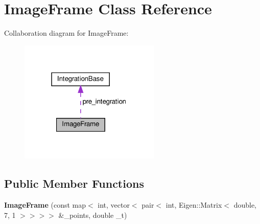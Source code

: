 \hypertarget{classImageFrame}{}\section{Image\+Frame Class Reference}
\label{classImageFrame}


Collaboration diagram for Image\+Frame\+:\nopagebreak
\begin{figure}[H]
\begin{center}
\leavevmode
\includegraphics[width=190pt]{classImageFrame__coll__graph}
\end{center}
\end{figure}
\subsection*{Public Member Functions}
\begin{DoxyCompactItemize}
\item 
\mbox{\label{classImageFrame_aba1b49928b6e1558710e8ce7591f151a}} 
{\bfseries Image\+Frame} (const map$<$ int, vector$<$ pair$<$ int, Eigen\+::\+Matrix$<$ double, 7, 1 $>$$>$$>$$>$ \&\+\_\+points, double \+\_\+t)
\end{DoxyCompactItemize}
